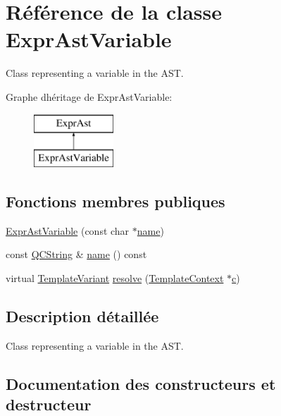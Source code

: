 \hypertarget{class_expr_ast_variable}{}\section{Référence de la classe Expr\+Ast\+Variable}
\label{class_expr_ast_variable}


Class representing a variable in the A\+S\+T.  


Graphe d\textquotesingle{}héritage de Expr\+Ast\+Variable\+:\begin{figure}[H]
\begin{center}
\leavevmode
\includegraphics[height=2.000000cm]{class_expr_ast_variable}
\end{center}
\end{figure}
\subsection*{Fonctions membres publiques}
\begin{DoxyCompactItemize}
\item 
\hyperlink{class_expr_ast_variable_aaaad0eb18a8abe3c069c44c208d9dd70}{Expr\+Ast\+Variable} (const char $\ast$\hyperlink{class_expr_ast_variable_a5cebd45b632e08aa82e9e039fb50da0a}{name})
\item 
const \hyperlink{class_q_c_string}{Q\+C\+String} \& \hyperlink{class_expr_ast_variable_a5cebd45b632e08aa82e9e039fb50da0a}{name} () const 
\item 
virtual \hyperlink{class_template_variant}{Template\+Variant} \hyperlink{class_expr_ast_variable_a76e7c3baa880897b24a9ceff6d69eb7d}{resolve} (\hyperlink{class_template_context}{Template\+Context} $\ast$\hyperlink{060__command__switch_8tcl_ab14f56bc3bd7680490ece4ad7815465f}{c})
\end{DoxyCompactItemize}


\subsection{Description détaillée}
Class representing a variable in the A\+S\+T. 

\subsection{Documentation des constructeurs et destructeur}
\hypertarget{class_expr_ast_variable_aaaad0eb18a8abe3c069c44c208d9dd70}{}
